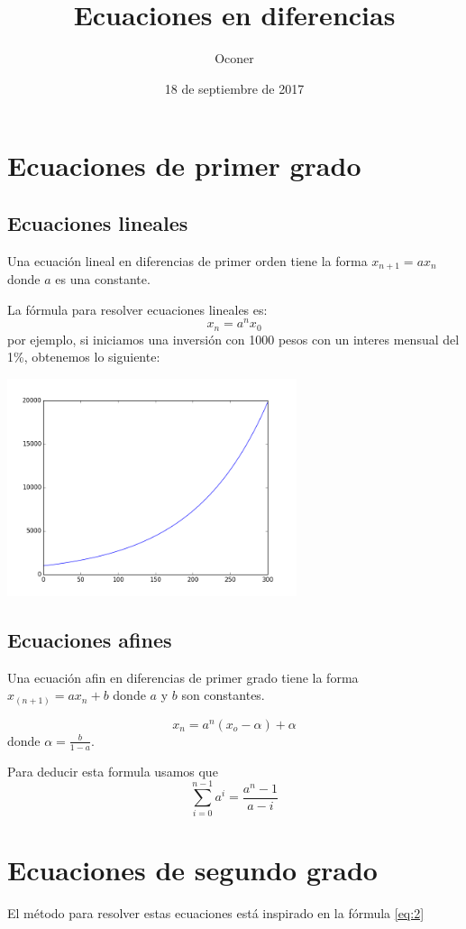 \documentclass{article}
\title{Ecuaciones en diferencias}
\author{Oconer}
\date{18 de septiembre de 2017}
\begin{document}
\maketitle

\section{Ecuaciones de primer grado}
\subsection{Ecuaciones lineales}
Una ecuación lineal en diferencias de primer orden tiene la forma $x_{n+1}=ax_n$
donde $a$ es una constante.

La fórmula para resolver ecuaciones lineales es:
\begin{equation}
\label{eq:2}
  x_n=a^nx_0
\end{equation}
por ejemplo, si iniciamos una inversión con 1000 pesos con un interes mensual del 1\%, obtenemos lo siguiente:

\begin{center}
  \includegraphics[width=8.5cm]{inversion.png}
\end{center}


\subsection{Ecuaciones afines}
Una ecuación afin en diferencias de primer grado tiene la forma $x_(n+1)=ax_n+b$
donde $a$ y $b$ son constantes.

\begin{equation}
 \label{eq:1}
  x_n=a^n(x_o-\alpha)+\alpha
\end{equation}
 donde $\alpha=\frac{b}{1-a}$.

 Para deducir esta formula usamos que
  $$\sum_{i=0}^{n-1}a^i=\frac{a^n-1}{a-i}$$

 \section{Ecuaciones de segundo grado}
 El método para resolver estas ecuaciones está inspirado en la fórmula \ref{eq:2}
 
\end{document}
